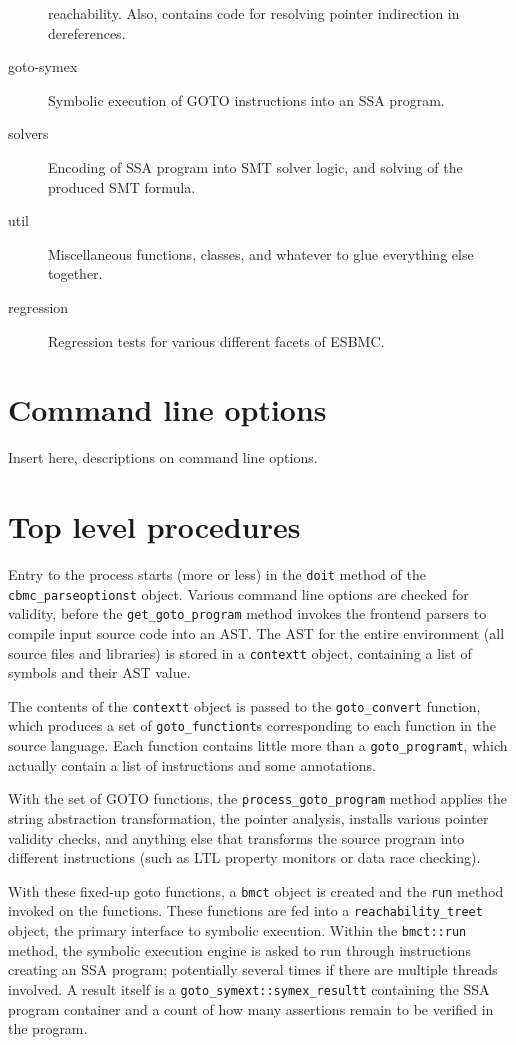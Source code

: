 \documentclass{article}
\begin{document}
\begin{description}
                        reachability. Also, contains code for resolving pointer
                        indirection in dereferences.
\item[goto-symex] Symbolic execution of GOTO instructions into an SSA program.
\item[solvers] Encoding of SSA program into SMT solver logic, and solving of
               the produced SMT formula.
\item[util] Miscellaneous functions, classes, and whatever to glue everything
            else together.
\item[regression] Regression tests for various different facets of ESBMC.
\end{description}

\section{Command line options}

Insert here, descriptions on command line options.

\section{Top level procedures}

Entry to the process starts (more or less) in the \texttt{doit} method of the
\texttt{cbmc\_parseoptionst} object. Various command line options are checked
for validity, before the \texttt{get\_goto\_program} method invokes the
frontend parsers to compile input source code into an AST. The AST for the
entire environment (all source files and libraries) is stored in a
\texttt{contextt} object, containing a list of symbols and their AST value.

The contents of the \texttt{contextt} object is passed to the
\texttt{goto\_convert} function, which produces a set of
\texttt{goto\_functiont}s corresponding to each function in the source language.
Each function contains little more than a \texttt{goto\_programt}, which
actually contain a list of instructions and some annotations.

With the set of GOTO functions, the \texttt{process\_goto\_program} method
applies the string abstraction transformation, the pointer analysis,
installs various pointer validity checks, and anything else that transforms
the source program into different instructions (such as LTL property monitors
or data race checking).

With these fixed-up goto functions, a \texttt{bmct} object is created and the
\texttt{run} method invoked on the functions. These functions are fed into a
\texttt{reachability\_treet} object, the primary interface to symbolic
execution. Within the \texttt{bmct::run} method, the symbolic execution engine
is asked to run through instructions creating an SSA program; potentially
several times if there are multiple threads involved. A result itself is a
\texttt{goto\_symext::symex\_resultt} containing the SSA program container and
a count of how many assertions remain to be verified in the program.
\end{document}
